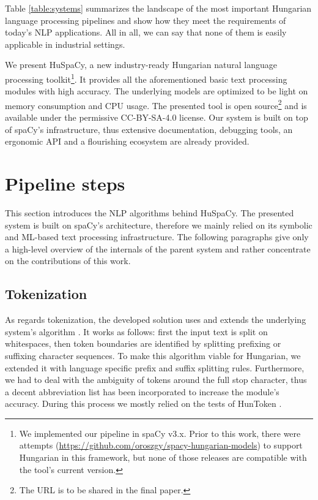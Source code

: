 \documentclass{llncs}
\newcommand{\huspacy}{HuSpaCy}
\newcommand{\huntoken}{HunToken}
\begin{document}
Table \ref{table:systems} summarizes the landscape of the most important Hungarian language processing pipelines and show how they meet the requirements of today’s NLP applications. All in all, we can say that none of them is easily applicable in industrial settings.

We present \huspacy{}, a new industry-ready Hungarian natural language processing toolkit\footnote{We implemented our pipeline in spaCy v3.x. Prior to this work, there were attempts (\url{https://github.com/oroszgy/spacy-hungarian-models}) to support Hungarian in this framework, but none of those releases are compatible with the tool’s current version.}. 
It provides all the aforementioned basic text processing modules with high accuracy. The underlying models are optimized to be light on memory consumption and CPU usage. The presented tool is open source\footnote{The URL is to be shared in the final paper.} and is available under the permissive CC-BY-SA-4.0 license. Our system is built on top of spaCy’s infrastructure, thus extensive documentation, debugging tools, an ergonomic API and a flourishing ecosystem are already provided.

\section{Pipeline steps}

This section introduces the NLP algorithms behind \huspacy{}. The presented system is built on spaCy’s architecture, therefore we mainly relied on its symbolic and ML-based text processing infrastructure. The following paragraphs give only a high-level overview of the internals of the parent system and rather concentrate on the contributions of this work.

\subsection{Tokenization}

As regards tokenization, the developed solution uses and extends the underlying system’s algorithm \citep{spacy-tokenization}. It works as follows: first the input text is split on whitespaces, then token boundaries are identified by splitting prefixing or suffixing character sequences. To make this algorithm viable for Hungarian, we extended it with language specific prefix and suffix splitting rules. Furthermore, we had to deal with the ambiguity of tokens around the full stop character, thus a decent abbreviation list has been incorporated to increase the module’s accuracy. During this process we mostly relied on the tests of \huntoken{} \citep{huntoken}.
\end{document}
